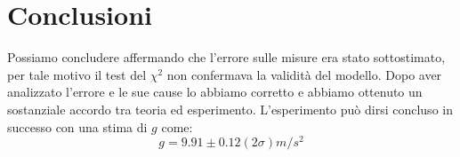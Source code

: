 \documentclass[a4paper,10pt]{article}
\begin{document}
\section{Conclusioni}
Possiamo concludere affermando che l'errore sulle misure era stato sottostimato, per tale motivo il test del  $\chi^2$ non confermava la validità del modello. Dopo aver analizzato l'errore e le sue cause lo abbiamo corretto e abbiamo ottenuto un sostanziale accordo tra teoria ed esperimento.
L'esperimento può dirsi concluso in successo con una stima di $g$ come:
\begin{equation}
g=9.91\pm 0.12 (2\sigma) m/s^2
\end{equation}
\end{document}

